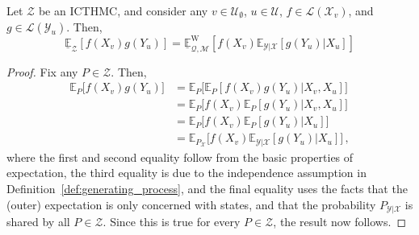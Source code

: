 \documentclass[twoside,11pt]{article}
\newcommand{\states}{\mathcal{X}}
\newcommand{\observs}{\mathcal{Y}}
\newcommand{\lexp}{\underline{\mathbb{E}}_{\rateset,\mathcal{M}}^\mathrm{W}}
\newcommand{\gambles}{\mathcal{L}}
\newcommand{\rateset}{\mathcal{Q}}
\begin{document}
\begin{proposition}\label{prop:decomp}
Let $\mathcal{Z}$ be an ICTHMC, and consider any $v\in\mathcal{U}_\emptyset$, $u\in\mathcal{U}$, $f\in\gambles(\states_v)$, and $g\in\gambles(\observs_u)$. Then,
\begin{equation*}
\underline{\mathbb{E}}_\mathcal{Z}\left[ f(X_v)g(Y_u) \right] = \lexp\left[ f(X_v)\mathbb{E}_{\observs\vert\states}[g(Y_u)\vert X_u] \right] 
\end{equation*}
\end{proposition}
\begin{proof}
Fix any $P\in\mathcal{Z}$. Then,
\begin{align*}
\mathbb{E}_P\bigl[ f(X_v)g(Y_u) \bigr] &= \mathbb{E}_P\bigl[ \mathbb{E}_P\left[ f(X_v)g(Y_u) \vert X_v,X_u \right] \bigr] \\
&= \mathbb{E}_P\bigl[ f(X_v)\mathbb{E}_P[ g(Y_u) \vert X_v,X_u ] \bigr] \\
&= \mathbb{E}_P\bigl[ f(X_v)\mathbb{E}_P[ g(Y_u) \vert X_u ] \bigr] \\
&= \mathbb{E}_{P_\states}\bigl[ f(X_v)\mathbb{E}_{\observs\vert\states}[ g(Y_u) \vert X_u ] \bigr] \,,
\end{align*}
where the first and second equality follow from the basic properties of expectation, the third equality is due to the independence assumption in Definition~\ref{def:generating_process}, and the final equality uses the facts that the (outer) expectation is only concerned with states, and that the probability $P_{\observs\vert\states}$ is shared by all $P\in\mathcal{Z}$. Since this is true for every $P\in\mathcal{Z}$, the result now follows.
\end{proof}
\end{document}
